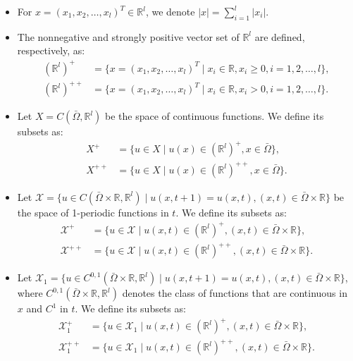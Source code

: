 \documentclass[11pt,reqno]{amsart}
\numberwithin{equation}{section}
\begin{document}
\begin{itemize}[leftmargin= 0.8cm]
\item For $x=(x_1, x_2, \dots, x_l)^T \in \mathbb{R}^l$, we denote $|x| = \sum_{i=1}^l |x_i|$.

\item The nonnegative and strongly positive vector set of $\mathbb{R}^l$ are defined, respectively, as:
\begin{align*}
(\mathbb{R}^l)^+ &= \{x=(x_1, x_2, \dots, x_l)^T \mid x_i \in \mathbb{R}, x_i \geq 0, i=1, 2, \dots, l\},
\\
(\mathbb{R}^l)^{++} &= \{x=(x_1, x_2, \dots, x_l)^T \mid x_i \in \mathbb{R}, x_i > 0, i=1, 2, \dots, l\}.
\end{align*}
\item Let $X = C(\bar{\Omega}, \mathbb{R}^l)$ be the space of continuous functions. We define its subsets as:
\begin{align*}
X^+ &= \{u \in X \mid u(x) \in (\mathbb{R}^l)^+, x \in \bar{\Omega}\},
\\
X^{++} &= \{u \in X \mid u(x) \in (\mathbb{R}^l)^{++}, x \in \bar{\Omega}\}.
\end{align*}
\item Let $\mathcal{X} = \{u \in C(\bar{\Omega} \times \mathbb{R}, \mathbb{R}^l) \mid u(x, t+1) = u(x, t), (x, t) \in \bar{\Omega} \times \mathbb{R}\}$ be the space of 1-periodic functions in $t$. We define its subsets as:
\begin{align*}
\mathcal{X}^+ &= \{u \in \mathcal{X} \mid u(x, t) \in (\mathbb{R}^l)^+, (x, t) \in \bar{\Omega} \times \mathbb{R}\},
\\
\mathcal{X}^{++} &= \{u \in \mathcal{X} \mid u(x, t) \in (\mathbb{R}^l)^{++}, (x, t) \in \bar{\Omega} \times \mathbb{R}\}.
\end{align*}


\item Let $\mathcal{X}_1 = \{u \in C^{0,1}(\bar{\Omega} \times \mathbb{R}, \mathbb{R}^l) \mid u(x, t+1) = u(x, t), (x, t) \in \bar{\Omega} \times \mathbb{R}\}$, where $C^{0,1}(\bar{\Omega} \times \mathbb{R}, \mathbb{R}^l)$ denotes the class of functions that are continuous in $x$ and $C^1$ in $t$. We define its subsets as:
\begin{align*}
\mathcal{X}_1^+ &= \{u \in \mathcal{X}_1 \mid u(x, t) \in (\mathbb{R}^l)^+, (x, t) \in \bar{\Omega} \times \mathbb{R}\},
\\
\mathcal{X}_1^{++} &= \{u \in \mathcal{X}_1 \mid u(x, t) \in (\mathbb{R}^l)^{++}, (x, t) \in \bar{\Omega} \times \mathbb{R}\}.
\end{align*}


\end{itemize}
\end{document}
